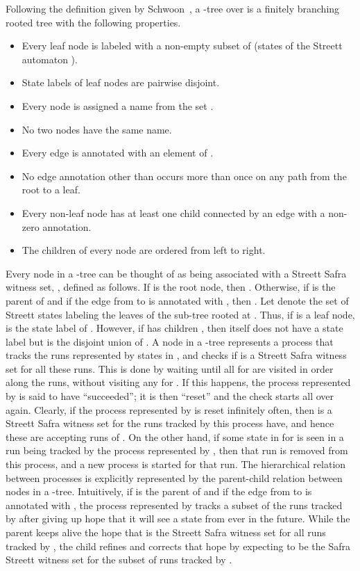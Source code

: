 \documentclass[3p]{elsarticle}
\begin{document}
Following the definition given by Schwoon~\cite{2001automata}, a -tree over  is a finitely branching rooted tree with the
following properties.
\begin{itemize}
\item Every leaf node is labeled with a non-empty subset of 
  (states of the Streett automaton ).
\item State labels of leaf nodes are pairwise disjoint.
\item Every node is assigned a name from the set .
\item No two nodes have the same name.
\item Every edge is annotated with an element of .
\item No edge annotation other than  occurs more than once on any path from
  the root to a leaf.
\item Every non-leaf node has at least one child connected by an edge
  with a non-zero annotation.
\item The children of every node are ordered from left to right.
\end{itemize}


Every node  in a -tree can be thought of as being
associated with a Streett Safra witness set, , defined as
follows.  If  is the root node, then .  Otherwise, if  is the parent of  and if the edge from 
to  is annotated with , then .
Let  denote the set of Streett states labeling the leaves
of the sub-tree rooted at .  Thus, if  is a leaf node,
 is the state label of .  However, if  has children , then  itself does not have a state label but
 is the disjoint union of .  A node  in a -tree represents a
process that tracks the runs represented by states in ,
and checks if  is a Streett Safra witness set for all these
runs.  This is done by waiting until all  for  are
visited in order along the runs, without visiting any  for .  If this happens, the process represented by  is said
to have ``succeeded''; it is then ``reset'' and the check starts all
over again.  Clearly, if the process represented by  is reset
infinitely often, then  is a Streett Safra witness set for the
runs tracked by this process have, and hence these are accepting runs
of .  On the other hand, if some state in  for  is seen in a run being tracked by the process represented by
, then that run is removed from this process, and a new process is
started for that run.  The hierarchical relation between processes is
explicitly represented by the parent-child relation between nodes in a
-tree.  Intuitively, if  is the parent of  and if the
edge from  to  is annotated with , the process represented
by  tracks a subset of the runs tracked by  after giving up
hope that it will see a state from  ever in the future.  While
the parent  keeps alive the hope that  is the Streett Safra
witness set for all runs tracked by , the child  refines and
corrects that hope by expecting  to be
the Safra Streett witness set for the subset of runs tracked by .
\end{document}
